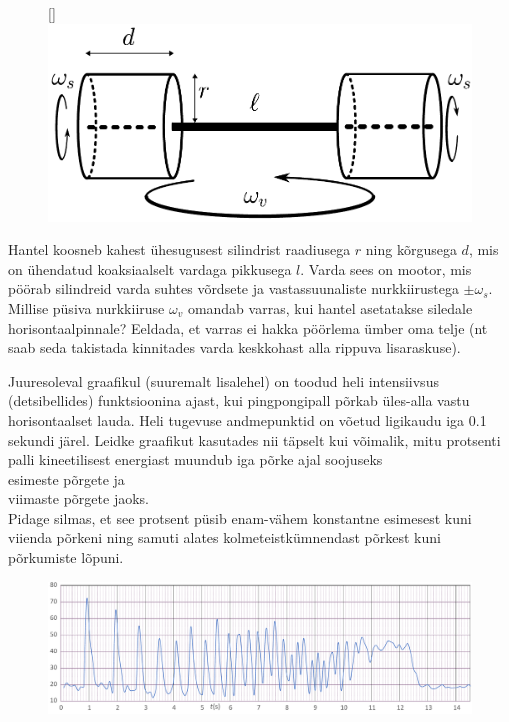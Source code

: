 \documentclass[10pt]{article}
\begin{document}
\begin{figure}
\raisebox{0pt}[\dimexpr{}\baselineskip\relax]{\includegraphics[scale=0.37]{2022-lahg-10-yl.pdf}}
\vspace{-15pt}
\end{figure}
Hantel koosneb kahest ühesugusest silindrist raadiusega $r$ ning kõrgusega $d$, mis on ühendatud koaksiaalselt vardaga pikkusega $l$. Varda sees on mootor, mis pöörab silindreid varda suhtes võrdsete ja vastassuunaliste nurkkiirustega $\pm \omega_s$. Millise püsiva nurkkiiruse $\omega_v$ omandab varras, kui hantel asetatakse siledale horisontaalpinnale? Eeldada, et varras ei hakka pöörlema ümber oma telje (nt saab seda takistada kinnitades varda keskkohast alla rippuva lisaraskuse).
\probend
\bigskip


Juuresoleval graafikul (suuremalt lisalehel) on toodud heli intensiivsus (detsibellides) funktsioonina ajast, kui pingpongipall põrkab üles-alla vastu horisontaalset lauda. Heli tugevuse andmepunktid on võetud ligikaudu iga \num{0.1} sekundi järel. Leidke graafikut kasutades nii täpselt kui võimalik, mitu protsenti palli kineetilisest energiast muundub iga põrke ajal soojuseks\\
\osa esimeste põrgete ja \\
\osa viimaste põrgete jaoks.\\
Pidage silmas, et see protsent püsib enam-vähem konstantne esimesest kuni viienda põrkeni ning samuti alates kolmeteistkümnendast põrkest kuni põrkumiste lõpuni.
\begin{figure}[!h]
  \centering
  \includegraphics[width=\textwidth]{2022-v2g-10-yl.pdf}
\end{figure}
\probend
\bigskip
\end{document}
